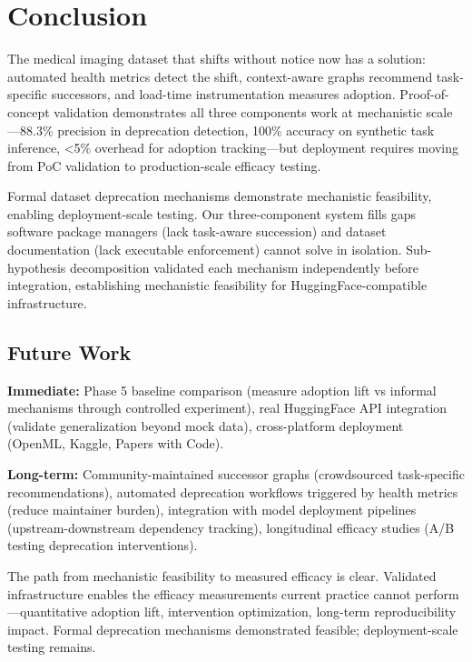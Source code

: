 \section{Conclusion}

The medical imaging dataset that shifts without notice now has a solution: automated health metrics detect the shift, context-aware graphs recommend task-specific successors, and load-time instrumentation measures adoption. Proof-of-concept validation demonstrates all three components work at mechanistic scale---88.3\% precision in deprecation detection, 100\% accuracy on synthetic task inference, <5\% overhead for adoption tracking---but deployment requires moving from PoC validation to production-scale efficacy testing.

Formal dataset deprecation mechanisms demonstrate mechanistic feasibility, enabling deployment-scale testing. Our three-component system fills gaps software package managers (lack task-aware succession) and dataset documentation (lack executable enforcement) cannot solve in isolation. Sub-hypothesis decomposition validated each mechanism independently before integration, establishing mechanistic feasibility for HuggingFace-compatible infrastructure.

\subsection{Future Work}

\textbf{Immediate:} Phase 5 baseline comparison (measure adoption lift vs informal mechanisms through controlled experiment), real HuggingFace API integration (validate generalization beyond mock data), cross-platform deployment (OpenML, Kaggle, Papers with Code).

\textbf{Long-term:} Community-maintained successor graphs (crowdsourced task-specific recommendations), automated deprecation workflows triggered by health metrics (reduce maintainer burden), integration with model deployment pipelines (upstream-downstream dependency tracking), longitudinal efficacy studies (A/B testing deprecation interventions).

The path from mechanistic feasibility to measured efficacy is clear. Validated infrastructure enables the efficacy measurements current practice cannot perform---quantitative adoption lift, intervention optimization, long-term reproducibility impact. Formal deprecation mechanisms demonstrated feasible; deployment-scale testing remains.
